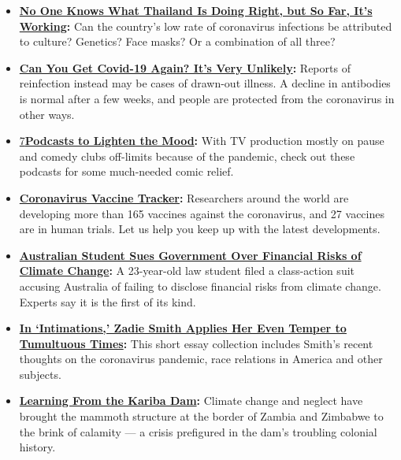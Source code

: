 \begin{itemize}
\item
  \textbf{\href{https://www.nytimes3xbfgragh.onion/2020/07/16/world/asia/coronavirus-thailand-photos.html}{No
  One Knows What Thailand Is Doing Right, but So Far, It's Working}:}
  Can the country's low rate of coronavirus infections be attributed to
  culture? Genetics? Face masks? Or a combination of all three?
\item
  \textbf{\href{https://www.nytimes3xbfgragh.onion/2020/07/22/health/covid-antibodies-herd-immunity.html}{Can
  You Get Covid-19 Again? It's Very Unlikely}:} Reports of reinfection
  instead may be cases of drawn-out illness. A decline in antibodies is
  normal after a few weeks, and people are protected from the
  coronavirus in other ways.
\item
  \href{https://www.nytimes3xbfgragh.onion/2020/07/22/arts/comedy-funny-podcasts.html}{7}\textbf{\href{https://www.nytimes3xbfgragh.onion/2020/07/22/arts/comedy-funny-podcasts.html}{Podcasts
  to Lighten the Mood}:} With TV production mostly on pause and comedy
  clubs off-limits because of the pandemic, check out these podcasts for
  some much-needed comic relief.
\item
  \textbf{\href{https://www.nytimes3xbfgragh.onion/interactive/2020/science/coronavirus-vaccine-tracker.html}{Coronavirus
  Vaccine Tracker}:} Researchers around the world are developing more
  than 165 vaccines against the coronavirus, and 27 vaccines are in
  human trials. Let us help you keep up with the latest developments.
\item
  \textbf{\href{https://www.nytimes3xbfgragh.onion/2020/07/23/world/australia/lawsuit-climate-change-bonds.html}{Australian
  Student Sues Government Over Financial Risks of Climate Change}:} A
  23-year-old law student filed a class-action suit accusing Australia
  of failing to disclose financial risks from climate change. Experts
  say it is the first of its kind.
\item
  \textbf{\href{https://www.nytimes3xbfgragh.onion/2020/07/22/books/review-intimations-essays-zadie-smith.html}{In
  `Intimations,' Zadie Smith Applies Her Even Temper to Tumultuous
  Times}:} This short essay collection includes Smith's recent thoughts
  on the coronavirus pandemic, race relations in America and other
  subjects.
\item
  \textbf{\href{https://www.nytimes3xbfgragh.onion/interactive/2020/07/22/magazine/zambia-kariba-dam.html}{Learning
  From the Kariba Dam}:} Climate change and neglect have brought the
  mammoth structure at the border of Zambia and Zimbabwe to the brink of
  calamity --- a crisis prefigured in the dam's troubling colonial
  history.
\end{itemize}

